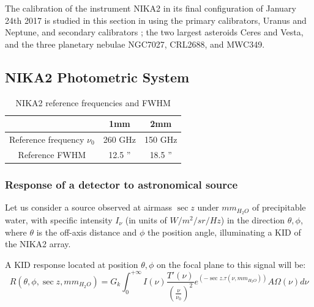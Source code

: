 %


The calibration of the instrument NIKA2 in its final configuration
of January 24th 2017  is studied in this section  in using the 
 primary calibrators, Uranus and Neptune, and secondary calibrators ; the two largest asteroids Ceres and Vesta, and the three
planetary nebulae NGC7027, CRL2688, and MWC349.

\subsection{NIKA2 Photometric System}


\begin{table}[h]
\begin{center}
\begin{tabular}{|c|c|c|}
\hline
     & 1mm & 2mm \\
\hline
Reference frequency $\nu_{0}$ & 260 GHz & 150 GHz \\
\hline
Reference FWHM                      & 12.5  '' & 18.5 '' \\
\hline
\end{tabular}
\caption{NIKA2 reference frequencies and FWHM}
\end{center}
\label{tab:definitions}
\end{table}

\subsubsection{Response of a detector to astronomical source}


Let us consider a source observed at airmass $\sec z$ under
$mm_{H_{2}O}$ of precipitable water, with specific intensity $I_{\nu}$ (in units
of  $W/m^{2}/sr/Hz$) in the direction $\theta, \phi$, where $\theta$
is the off-axis distance and $\phi$ the position angle, illuminating a KID
of the NIKA2 array. 

A KID response located at position $\theta, \phi$
on the focal plane to this signal will be:
\begin{equation}
R(\theta, \phi, \sec z, mm_{H_{2}O}) = G_{k} \int_{0}^{+\infty} I(\nu)
\frac{T'(\nu)}{\left(\frac{\nu}{\nu_{0}}\right)^{2}} e^{\left(-\sec z
  . \tau(\nu,  mm_{H_{2}O})\right)}A\Omega (\nu)  d\nu 
\label{eq:basicphot}
\end{equation}

